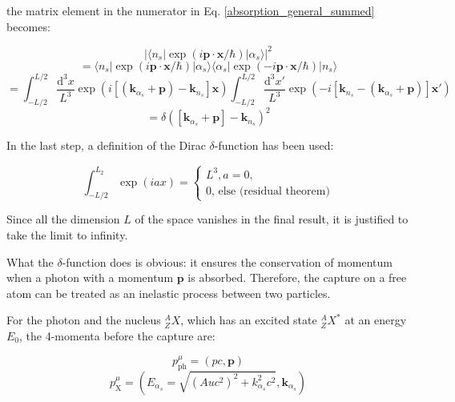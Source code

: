 \documentclass{article}
\begin{document}
the matrix element in the numerator in Eq. \ref{absorption_general_summed} becomes:

\begin{equation}
	\label{plane_wave_delta}
	\left| \langle n_s | \exp{\left( i \mathbf{p} \cdot \mathbf{x} / \hbar \right)} | \alpha_s \rangle \right|^2 
\end{equation}
\begin{equation*}
	= \langle n_s | \exp{\left( i \mathbf{p} \cdot \mathbf{x} / \hbar \right)} | \alpha_s \rangle \langle \alpha_s | \exp{\left( -i \mathbf{p} \cdot \mathbf{x} / \hbar \right)} | n_s \rangle
\end{equation*}
\begin{equation*}
	= \int_{-L/2}^{L/2} \frac{\mathrm{d}^3 x}{L^3} \exp{ \left( i \left[ \left( \mathbf{k}_{\alpha_s} + \mathbf{p} \right) - \mathbf{k}_{n_s} \right] \mathbf{x} \right) } \int_{-L/2}^{L/2}\frac{\mathrm{d}^3 x'}{L^3} \exp{ \left( - i \left[ \mathbf{k}_{n_s} - \left( \mathbf{k}_{\alpha_s} + \mathbf{p} \right) \right] \mathbf{x}' \right) }
\end{equation*}
\begin{equation*}
	= \delta \left( \left[ \mathbf{k}_{\alpha_s} + \mathbf{p} \right] - \mathbf{k}_{n_s} \right)^2
\end{equation*}

In the last step, a definition of the Dirac $\delta$-function has been used:

\begin{equation}
	\int_{-L/2}^{L_2} \exp{ \left( i a x \right) } = 
	\begin{cases}
	L^3, a = 0,\\
	0 \text{, else (residual theorem)}
	\end{cases}
\end{equation}

Since all the dimension $L$ of the space vanishes in the final result, it is justified to take the limit to infinity.

What the $\delta$-function does is obvious: it ensures the conservation of momentum when a photon with a momentum $\mathbf{p}$ is absorbed. 
Therefore, the capture on a free atom can be treated as an inelastic process between two particles. 

For the photon and the nucleus $^A_ZX$, which has an excited state $^A_ZX^*$ at an energy $E_0$, the 4-momenta before the capture are:

\begin{equation}
\label{four_momentum_photon}
	p^\mu_{\mathrm{ph}} = \left( p c, \mathbf{p} \right)
\end{equation}
\begin{equation}
\label{four_momentum_nucleus}
	p^\mu_{\mathrm{X}} = \left( E_{\alpha_s} = \sqrt{ \left(Au c^2\right)^2 + k_{\alpha_s}^2 c^2}, \mathbf{k}_{\alpha_s} \right)
\end{equation}
\end{document}
